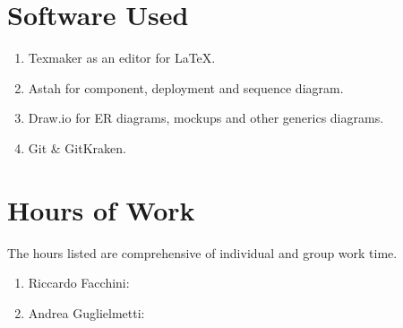 \section{Software Used}
\begin{enumerate}
\item Texmaker as an editor for \LaTeX.
\item Astah for component, deployment and sequence diagram.
\item Draw.io for ER diagrams, mockups and other generics diagrams.
\item Git \& GitKraken.
\end{enumerate}
\section{Hours of Work}
The hours listed are comprehensive of individual and group work time.
\begin{enumerate}
\item Riccardo Facchini:
\item Andrea Guglielmetti:
\end{enumerate}